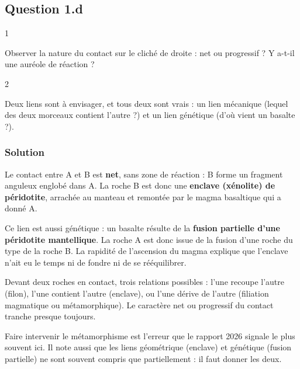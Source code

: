 \documentclass[11pt,a4paper]{article}
\begin{document}
\hypertarget{question-1.d}{%
\subsection{Question 1.d}\label{question-1.d}}

\begin{indication}{1}

Observer la nature du contact sur le cliché de droite : net ou progressif ? Y a-t-il une auréole de réaction ?

\end{indication}

\begin{indication}{2}

Deux liens sont à envisager, et tous deux sont vrais : un lien mécanique (lequel des deux morceaux contient l'autre ?) et un lien génétique (d'où vient un basalte ?).

\end{indication}

\hypertarget{solution-3}{%
\subsubsection{Solution}\label{solution-3}}

Le contact entre A et B est \textbf{net}, sans zone de réaction : B forme un fragment anguleux englobé dans A. La roche B est donc une \textbf{enclave (xénolite) de péridotite}, arrachée au manteau et remontée par le magma basaltique qui a donné A.

Ce lien est aussi génétique : un basalte résulte de la \textbf{fusion partielle d'une péridotite mantellique}. La roche A est donc issue de la fusion d'une roche du type de la roche B. La rapidité de l'ascension du magma explique que l'enclave n'ait eu le temps ni de fondre ni de se rééquilibrer.

\begin{methode}

Devant deux roches en contact, trois relations possibles : l'une recoupe l'autre (filon), l'une contient l'autre (enclave), ou l'une dérive de l'autre (filiation magmatique ou métamorphique). Le caractère net ou progressif du contact tranche presque toujours.

\end{methode}

\begin{piege}

Faire intervenir le métamorphisme est l'erreur que le rapport 2026 signale le plus souvent ici. Il note aussi que les liens géométrique (enclave) et génétique (fusion partielle) ne sont souvent compris que partiellement : il faut donner les deux.

\end{piege}
\end{document}
